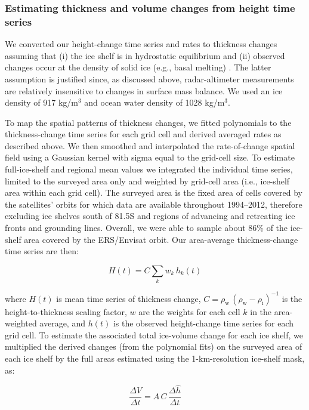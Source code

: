 \subsubsection*{Estimating thickness and volume changes from height time series}

We converted our height-change time series and rates to thickness changes
assuming that (i) the ice shelf is in hydrostatic equilibrium and (ii)
observed changes occur at the density of solid ice (e.g., basal melting)
\parencite{Shepherd2010, Pritchard2012, Wingham2009}. The latter assumption is
justified since, as discussed above, radar-altimeter measurements are
relatively insensitive to changes in surface mass balance. We used an ice
density of 917 kg/m$^3$ and ocean water density of 1028 kg/m$^3$.

To map the spatial patterns of thickness changes, we fitted polynomials to the
thickness-change time series for each grid cell and derived averaged rates as
described above. We then smoothed and interpolated the rate-of-change spatial
field using a Gaussian kernel with sigma equal to the grid-cell size. To
estimate full-ice-shelf and regional mean values we integrated the individual
time series, limited to the surveyed area only and weighted by grid-cell area
(i.e., ice-shelf area within each grid cell). The surveyed area is the fixed
area of cells covered by the satellites' orbits for which data are available
throughout 1994--2012, therefore excluding ice shelves south of 81.5\degree S
and regions of advancing and retreating ice fronts and grounding lines.
Overall, we were able to sample about 86\% of the ice-shelf area covered by
the ERS/Envisat orbit. Our area-average thickness-change time series are then:

\begin{equation}
  H(t) = C \sum_k w_k \, h_k(t)
\end{equation}

\noindent
where $H(t)$ is mean time series of thickness change,
$C = \rho_{\text{w}} \, (\rho_{\text{w}} - \rho_{\text{i}})^{-1}$ is the
height-to-thickness scaling factor, $w$ are the weights for each cell $k$
in the area-weighted average, and $h(t)$ is the observed height-change time
series for each grid cell. To estimate the associated total ice-volume change
for each ice shelf, we multiplied the derived changes (from the polynomial
fits) on the surveyed area of each ice shelf by the full areas estimated
using the 1-km-resolution ice-shelf mask, as:

\begin{equation}
  \frac{\Delta V}{\Delta t} = A \, C \, \frac{\Delta \hat h}{\Delta t}
\end{equation}

